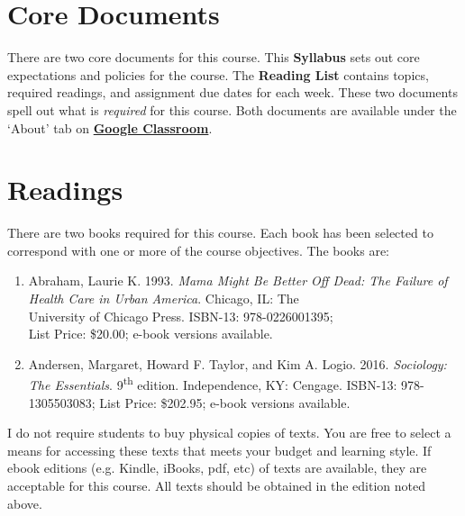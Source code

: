 \documentclass{tufte-book}
\begin{document}
\vspace{3mm}
\section{Core Documents}
There are two core documents for this course. This \textbf{Syllabus} sets out core expectations and policies for the course. The \textbf{Reading List} contains topics, required readings, and assignment due dates for each week. These two documents spell out what is \textit{required} for this course. Both documents are available under the `About' tab on \textbf{\href{https://classroom.google.com}{Google Classroom}}. 

\vspace{3mm}
\section{Readings}
There are two books required for this course. Each book has been selected to correspond with one or more of the course objectives. The books are:
\begin{enumerate}[leftmargin=!,labelindent=5pt,itemindent=-15pt]
\itemsep-.25em
\item Abraham, Laurie K. 1993. \textit{Mama Might Be Better Off Dead: The Failure of Health Care in Urban America}. Chicago, IL: The \\ University of Chicago Press. ISBN-13: 978-0226001395; \\ List Price: \$20.00; e-book versions available.
\item Andersen, Margaret, Howard F. Taylor, and Kim A. Logio. 2016. \textit{Sociology: The Essentials}. 9\textsuperscript{th} edition. Independence, KY: Cengage. ISBN-13: 978-1305503083; List Price: \$202.95; e-book versions available.
\end{enumerate}

\par I do not require students to buy physical copies of texts. You are free to select a means for accessing these texts that meets your budget and learning style. If ebook editions (e.g. Kindle, iBooks, pdf, etc) of texts are available, they are acceptable for this course. All texts should be obtained in the edition noted above. 
\end{document}
